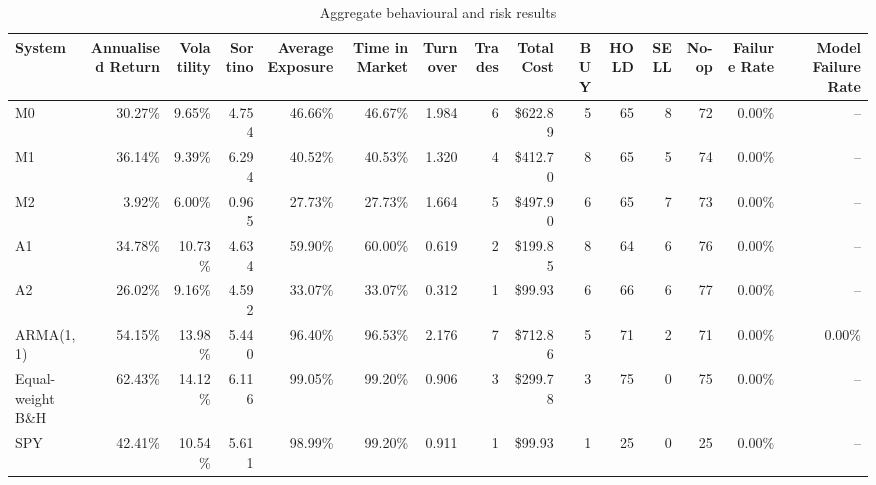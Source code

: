 \begin{table}[htbp]
\centering
\small
\caption{Aggregate behavioural and risk results}
\label{tab:aggregate-secondary}
\begin{tabular}{lrrrrrrrrrrrrrr}
\toprule
System & Annualised Return & Volatility & Sortino & Average Exposure & Time in Market & Turnover & Trades & Total Cost & BUY & HOLD & SELL & No-op & Failure Rate & Model Failure Rate \\
\midrule
M0 & 30.27\% & 9.65\% & 4.754 & 46.66\% & 46.67\% & 1.984 & 6 & \$622.89 & 5 & 65 & 8 & 72 & 0.00\% & -- \\
M1 & 36.14\% & 9.39\% & 6.294 & 40.52\% & 40.53\% & 1.320 & 4 & \$412.70 & 8 & 65 & 5 & 74 & 0.00\% & -- \\
M2 & 3.92\% & 6.00\% & 0.965 & 27.73\% & 27.73\% & 1.664 & 5 & \$497.90 & 6 & 65 & 7 & 73 & 0.00\% & -- \\
A1 & 34.78\% & 10.73\% & 4.634 & 59.90\% & 60.00\% & 0.619 & 2 & \$199.85 & 8 & 64 & 6 & 76 & 0.00\% & -- \\
A2 & 26.02\% & 9.16\% & 4.592 & 33.07\% & 33.07\% & 0.312 & 1 & \$99.93 & 6 & 66 & 6 & 77 & 0.00\% & -- \\
ARMA(1,1) & 54.15\% & 13.98\% & 5.440 & 96.40\% & 96.53\% & 2.176 & 7 & \$712.86 & 5 & 71 & 2 & 71 & 0.00\% & 0.00\% \\
Equal-weight B\&H & 62.43\% & 14.12\% & 6.116 & 99.05\% & 99.20\% & 0.906 & 3 & \$299.78 & 3 & 75 & 0 & 75 & 0.00\% & -- \\
SPY & 42.41\% & 10.54\% & 5.611 & 98.99\% & 99.20\% & 0.911 & 1 & \$99.93 & 1 & 25 & 0 & 25 & 0.00\% & -- \\
\bottomrule
\end{tabular}
\end{table}
